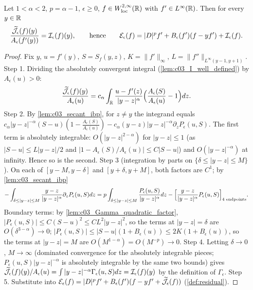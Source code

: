 \begin{proposition}
  \label{prop:analysis_semilinear_kernel}
  Let $1<\alpha<2$, $p=\alpha-1$, $\epsilon\ge0$, $f\in W^{2,\infty}_{\textup{loc}}(\mathbb{R})$ with $f'\in L^\infty(\mathbb{R})$. Then for every $y\in\mathbb{R}$
  \[
    \frac{\widetilde{\mathcal{J}}_\epsilon(f)(y)}{A_\epsilon(f'(y))}=\mathcal{I}_\epsilon(f)(y),
    \qquad\text{hence}\qquad
    \mathcal{E}_\epsilon(f)=|D|^pf'+B_\epsilon(f')(f-yf')+\mathcal{I}_\epsilon(f).
  \]
\end{proposition}
\begin{proof}
  Fix $y$, $u=f'(y)$, $S=S_f(y,z)$, $K=\|f'\|_\infty$, $L=\|f''\|_{L^\infty(y-1,y+1)}$.
  Step 1. Dividing the absolutely convergent integral (\cref{lem:c03_I_well_defined}) by $A_\epsilon(u)>0$:
  \begin{equation}\label{eqn:analysis_divided_remainder}
  \frac{\widetilde{\mathcal{J}}_\epsilon(f)(y)}{A_\epsilon(u)}=c_\alpha\int_{\mathbb{R}}\frac{u-f'(z)}{|y-z|^\alpha}\Bigl(\frac{A_\epsilon(S)}{A_\epsilon(u)}-1\Bigr)dz .
  \end{equation}
  Step 2. By \cref{lem:c03_secant_ibp}, for $z\ne y$ the integrand equals
  $c_\alpha|y-z|^{-\alpha}(S-u)(1-\frac{A_\epsilon(S)}{A_\epsilon(u)})-c_\alpha(y-z)|y-z|^{-\alpha}\partial_zP_\epsilon(u,S)$.
  The first term is absolutely integrable: $O(|y-z|^{2-\alpha})$ for $|y-z|\le1$ (as $|S-u|\le L|y-z|/2$ and $|1-A_\epsilon(S)/A_\epsilon(u)|\le C|S-u|$) and $O(|y-z|^{-\alpha})$ at infinity. Hence so is the second.
  Step 3 (integration by parts on $\{\delta\le|y-z|\le M\}$). On each of $[y-M,y-\delta]$ and $[y+\delta,y+M]$, both factors are $C^1$; by \cref{lem:c03_secant_ibp}
  \[
    -\int_{\delta\le|y-z|\le M}\frac{y-z}{|y-z|^\alpha}\partial_zP_\epsilon(u,S)dz
    =p\int_{\delta\le|y-z|\le M}\frac{P_\epsilon(u,S)}{|y-z|^\alpha}dz-\Bigl[\frac{y-z}{|y-z|^\alpha}P_\epsilon(u,S)\Bigr]_{\text{4 endpoints}} .
  \]
  Boundary terms: by \cref{lem:c03_Gamma_quadratic_factor}, $|P_\epsilon(u,S)|\le C(S-u)^2\le CL^2|y-z|^2$, so the terms at $|y-z|=\delta$ are $O(\delta^{3-\alpha})\to0$;
  $|P_\epsilon(u,S)|\le|S-u|(1+B_\epsilon(u))\le 2K(1+B_\epsilon(u))$, so the terms at $|y-z|=M$ are $O(M^{1-\alpha})=O(M^{-p})\to0$.
  Step 4. Letting $\delta\to0$, $M\to\infty$ (dominated convergence for the absolutely integrable pieces; $P_\epsilon(u,S)|y-z|^{-\alpha}$ is absolutely integrable by the same two bounds) gives
  $\widetilde{\mathcal{J}}_\epsilon(f)(y)/A_\epsilon(u)=\int|y-z|^{-\alpha}\Gamma_\epsilon(u,S)dz=\mathcal{I}_\epsilon(f)(y)$ by the definition of $\Gamma_\epsilon$.
  Step 5. Substitute into $\mathcal{E}_\epsilon(f)=|D|^pf'+B_\epsilon(f')(f-yf'+\widetilde{\mathcal{J}}_\epsilon(f))$ (\cref{def:residual}).
\end{proof}

